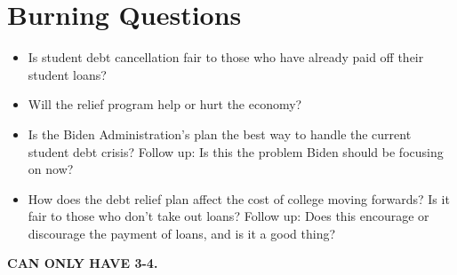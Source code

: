 \documentclass{../khw}
\begin{document}
\section{Burning Questions}

\begin{itemize}
    \item Is student debt cancellation fair to those who have already paid off their student loans?
    \item Will the relief program help or hurt the economy?
    \item Is the Biden Administration's plan the best way to handle the current student debt crisis?
    \nestitem Follow up:   Is this the problem Biden should be focusing on now?

    \item How does the debt relief plan affect the cost of college moving forwards? Is it fair to those who don't take out loans?
    \nestitem Follow up:   Does this encourage or discourage the payment of loans, and is it a good thing?
\end{itemize}

\textbf{CAN ONLY HAVE 3-4.}
\end{document}
